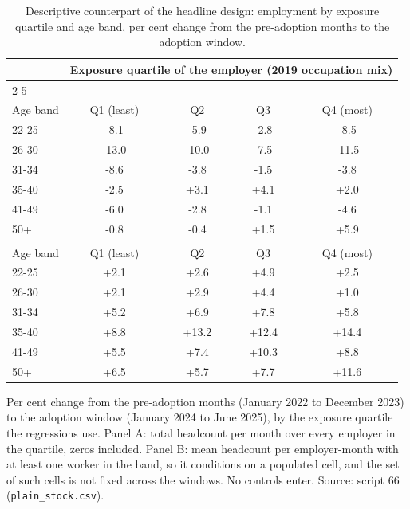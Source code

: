 \begin{table}[ht!]
\centering
\caption{Descriptive counterpart of the headline design: employment by exposure quartile and age band, per cent change from the pre-adoption months to the adoption window.}
\label{tab:descriptive_bands}
\footnotesize
\setlength{\tabcolsep}{3.5pt}
\begin{tabular}{lcccc}
\toprule
 & \multicolumn{4}{c}{Exposure quartile of the employer (2019 occupation mix)} \\
\cmidrule(lr){2-5}
\multicolumn{5}{l}{\textit{Panel A. Total headcount per month}} \\
\addlinespace[2pt]
Age band & Q1 (least) & Q2 & Q3 & Q4 (most) \\
\midrule
22-25 & -8.1 & -5.9 & -2.8 & -8.5 \\
26-30 & -13.0 & -10.0 & -7.5 & -11.5 \\
31-34 & -8.6 & -3.8 & -1.5 & -3.8 \\
35-40 & -2.5 & +3.1 & +4.1 & +2.0 \\
41-49 & -6.0 & -2.8 & -1.1 & -4.6 \\
50+ & -0.8 & -0.4 & +1.5 & +5.9 \\
\addlinespace[6pt]
\multicolumn{5}{l}{\textit{Panel B. Mean headcount per populated employer-month}} \\
\addlinespace[2pt]
Age band & Q1 (least) & Q2 & Q3 & Q4 (most) \\
\midrule
22-25 & +2.1 & +2.6 & +4.9 & +2.5 \\
26-30 & +2.1 & +2.9 & +4.4 & +1.0 \\
31-34 & +5.2 & +6.9 & +7.8 & +5.8 \\
35-40 & +8.8 & +13.2 & +12.4 & +14.4 \\
41-49 & +5.5 & +7.4 & +10.3 & +8.8 \\
50+ & +6.5 & +5.7 & +7.7 & +11.6 \\
\bottomrule
\end{tabular}
\begin{minipage}{0.92\textwidth}\footnotesize\vspace{4pt}
Per cent change from the pre-adoption months (January 2022 to December 2023) to the adoption window (January 2024 to June 2025), by the exposure quartile the regressions use. Panel A: total headcount per month over every employer in the quartile, zeros included. Panel B: mean headcount per employer-month with at least one worker in the band, so it conditions on a populated cell, and the set of such cells is not fixed across the windows. No controls enter. Source: script 66 (\texttt{plain\_stock.csv}).
\end{minipage}
\end{table}
